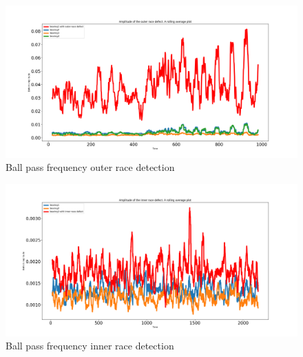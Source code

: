 \documentclass[11pt, oneside]{article}   	%
\begin{document}
\begin{figure}[H] %
   \centering
   \includegraphics[width=7in]{signal_processing_method_bpfo} 
   \caption{Ball pass frequency outer race detection}
   \label{fig:example}
\end{figure}

\begin{figure}[H] %
   \centering
   \includegraphics[width=7in]{signal_processing_method_bpfi} 
   \caption{Ball pass frequency inner race detection}
   \label{fig:example}
\end{figure}


\end{document}
